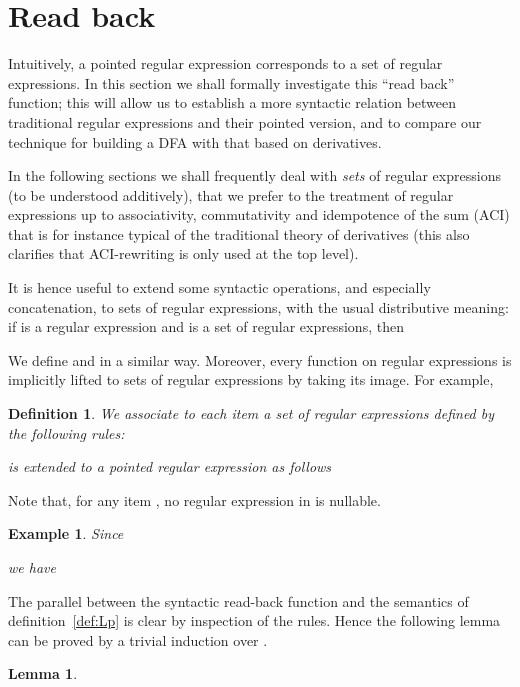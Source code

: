 \documentclass[preprint]{sigplanconf}
\newcounter{item}
\newtheorem{lemma}[item]{Lemma}
\newtheorem{definition}[item]{Definition}
\newtheorem{example}[item]{Example}
\begin{document}
\section{Read back}
Intuitively, a pointed regular expression corresponds to a set
of regular expressions. In this section we shall formally investigate
this ``read back'' function; this will allow us to establish a more
syntactic relation between traditional regular expressions 
and their pointed version, and to compare our technique for building 
a DFA with that based on derivatives.

In the following sections we shall frequently deal with {\em sets} of
regular expressions (to be understood additively), that we prefer to 
the treatment of regular expressions up to associativity, 
commutativity and idempotence of the sum (ACI) that is for instance typical
of the traditional theory of derivatives (this also clarifies that 
ACI-rewriting is only used at the top level). 

It is hence useful to extend some syntactic operations, and 
especially concatenation, to sets of regular expressions, with 
the usual distributive meaning: 
if  is a regular expression and  is a set of regular 
expressions, then 

We define  and  in a similar way. Moreover, every function
on regular expressions is implicitly lifted to sets of regular expressions by
taking its image. For example, 

\begin{definition}
We associate to each item  a set of regular expressions 
 defined by the
following rules:

 is extended to a pointed regular expression  as
follows

\end{definition}
Note that, for any item , no regular expression in  is nullable.

\begin{example}
Since

we have

\end{example}

The parallel between the syntactic read-back function  and the semantics
 of definition~\ref{def:Lp} is clear by inspection of the rules. Hence
the following lemma can be proved by a trivial induction over .

\begin{lemma}\label{techx}

\end{lemma}
\end{document}

